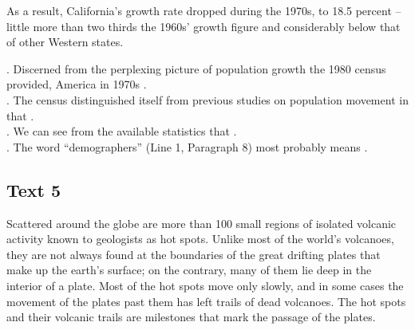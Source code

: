 As a result, California’s growth rate dropped during the 1970s, to 18.5 percent -- little more than two thirds the 1960s’ growth figure and considerably below that of other Western states.
\begin{questions}  .	Discerned from the perplexing picture of population growth the 1980 census provided, America in 1970s \ltk{}.\\
 .	The census distinguished itself from previous studies on population movement in that \ltk{}.\\
 .	We can see from the available statistics that \ltk{}.\\
 .	The word “demographers” (Line 1, Paragraph 8) most probably means \ltk{}.\\
\end{questions}    \subsection{Text 5}
Scattered around the globe are more than 100 small regions of isolated volcanic activity known to geologists as hot spots. Unlike most of the world’s volcanoes, they are not always found at the boundaries of the great drifting plates that make up the earth’s surface; on the contrary, many of them lie deep in the interior of a plate. Most of the hot spots move only slowly, and in some cases the movement of the plates past them has left trails of dead volcanoes. The hot spots and their volcanic trails are milestones that mark the passage of the plates.
